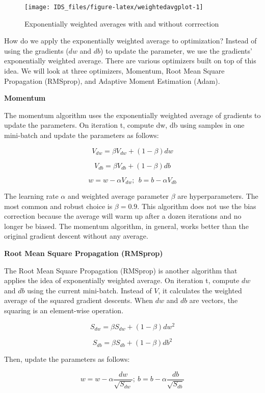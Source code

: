 \documentclass[
  12pt,
]{krantz}
\begin{document}
\begin{figure}

{\centering \texttt{[image: IDS\_files/figure-latex/weightedavgplot-1]} 

}

\caption{Exponentially weighted averages with and without corrrection}\label{fig:weightedavgplot}
\end{figure}

How do we apply the exponentially weighted average to optimization? Instead of using the gradients (\(dw\) and \(db\)) to update the parameter, we use the gradients' exponentially weighted average. There are various optimizers built on top of this idea. We will look at three optimizers, Momentum, Root Mean Square Propagation (RMSprop), and Adaptive Moment Estimation (Adam).

\textbf{Momentum}

The momentum algorithm uses the exponentially weighted average of gradients to update the parameters. On iteration t, compute dw, db using samples in one mini-batch and update the parameters as follows:

\[V_{dw} = \beta V_{dw}+(1-\beta)dw\]

\[V_{db} = \beta V_{db}+(1-\beta)db\]

\[w=w-\alpha V_{dw};\ \ b=b-\alpha V_{db}\]

The learning rate \(\alpha\) and weighted average parameter \(\beta\) are hyperparameters. The most common and robust choice is \(\beta = 0.9\). This algorithm does not use the bias correction because the average will warm up after a dozen iterations and no longer be biased. The momentum algorithm, in general, works better than the original gradient descent without any average.

\textbf{Root Mean Square Propagation (RMSprop)}

The Root Mean Square Propagation (RMSprop) is another algorithm that applies the idea of exponentially weighted average. On iteration t, compute \(dw\) and \(db\) using the current mini-batch. Instead of \(V\), it calculates the weighted average of the squared gradient descents. When \(dw\) and \(db\) are vectors, the squaring is an element-wise operation.

\[S_{dw}=\beta S_{dw} + (1-\beta)dw^2\]

\[S_{db}=\beta S_{db} + (1-\beta)db^2\]

Then, update the parameters as follows:

\[w = w - \alpha \frac{dw}{\sqrt{S_{dw}}};\ b=b-\alpha \frac{db}{\sqrt{S_{db}}}\]
\end{document}
